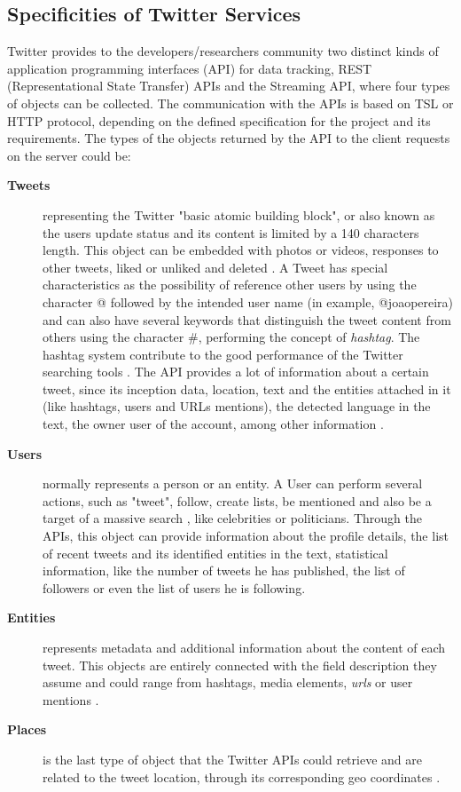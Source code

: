 \subsection{Specificities of Twitter Services}
Twitter provides to the developers/researchers community two distinct kinds of application programming interfaces (API) for data tracking, REST (Representational State Transfer) APIs and the Streaming API, where four types of objects can be collected. The communication with the APIs is based on TSL or HTTP protocol, depending on the defined specification for the project and its requirements.
The types of the objects returned by the API to the client requests on the server could be:
\begin{description}
\item [\textbf{Tweets}] representing the Twitter "basic atomic building block", or also known as the users update status and its content is limited by a 140 characters length. This object can be embedded with photos or videos, responses to other tweets, liked or unliked and deleted \cite{kn:TwitterTweets}. A Tweet has special characteristics as the possibility of reference other users by using the character @ followed by the intended user name (in example, @joaopereira) and can also have several keywords that distinguish the tweet content from others using the character \#, performing the concept of \textit{hashtag}. The hashtag system contribute to the good performance of the Twitter searching tools \cite{kn:Sriram2010}. The API provides a lot of information about a certain tweet, since its inception data, location, text and the entities attached in it (like hashtags, users and URLs mentions), the detected language in the text, the owner user of the account, among other information \cite{kn:TwitterTweets}.

\item [\textbf{Users}] normally represents a person or an entity. A User can perform several actions, such as "tweet", follow, create lists, be mentioned and also be a target of a massive search \cite{kn:TwitterUsers}, like celebrities or politicians. Through the APIs, this object can provide information about the profile details, the list of recent tweets and its identified entities in the text, statistical information, like the number of tweets he has published, the list of followers or even the list of users he is following.

\item [\textbf{Entities}] represents metadata and additional information about the content of each tweet. This objects are entirely connected with the field description they assume and could range from hashtags, media elements, \textit{urls} or user mentions \cite{kn:TwitterEntities}.

\item [\textbf{Places}] is the last type of object that the Twitter APIs could retrieve and are related to the tweet location, through its corresponding geo coordinates \cite{kn:TwitterPlaces}.
\end{description}

